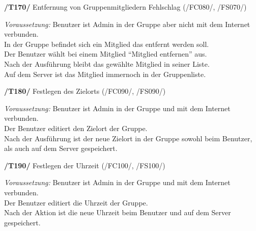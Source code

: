 \textbf{/T170/} Entfernung von Gruppenmitgliedern Fehlschlag (/FC080/, /FS070/)\\
\begin{center}
\vspace{-\parskip}
\begin{minipage}[t]{0.9\textwidth}
\emph{Voraussetzung:} Benutzer ist Admin in der Gruppe aber nicht mit dem Internet verbunden.\\
In der Gruppe befindet sich ein Mitglied das entfernt werden soll.\\
Der Benutzer wählt bei einem Mitglied "`Mitglied entfernen"' aus.    \\
Nach der Ausführung bleibt das gewählte Mitglied in seiner Liste.   \\
Auf dem Server ist das Mitglied immernoch in der Gruppenliste.       \\
\end{minipage}
\end{center}

\textbf{/T180/} Festlegen des Zielorts (/FC090/, /FS090/)\\
\begin{center}
\vspace{-\parskip}
\begin{minipage}[t]{0.9\textwidth}
\emph{Voraussetzung:} Benutzer ist Admin in der Gruppe und mit dem Internet verbunden.\\
Der Benutzer editiert den Zielort der Gruppe.                                   \\
Nach der Ausführung ist der neue Zielort in der Gruppe sowohl beim Benutzer,     \\
als auch auf dem Server gespeichert.                                              \\
\end{minipage}
\end{center}

\textbf{/T190/} Festlegen der Uhrzeit (/FC100/, /FS100/)\\
\begin{center}
\vspace{-\parskip}
\begin{minipage}[t]{0.9\textwidth}
\emph{Voraussetzung:} Benutzer ist Admin in der Gruppe und mit dem Internet verbunden.    \\
Der Benutzer editiert die Uhrzeit der Gruppe.                                       \\
Nach der Aktion ist die neue Uhrzeit beim Benutzer und auf dem Server gespeichert.   \\
\end{minipage}
\end{center}

